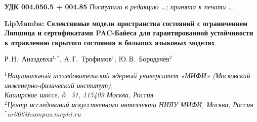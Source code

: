 \documentclass[12pt,a4paper]{article}
\theoremstyle{definition}
\theoremstyle{remark}
\begin{document}
\thispagestyle{empty}


\begin{otherlanguage}{russian}
\noindent\textbf{УДК 004.056.5 + 004.85}
\hfill
\textit{Поступила в редакцию \ldots; принята к печати \ldots}

\vspace{0.8em}

\begin{center}
{\large\bfseries
LipMamba: Селективные модели пространства состояний с
ограничением Липшица и сертификатами PAC-Байеса для
гарантированной устойчивости к отравлению скрытого состояния
в больших языковых моделях
\par}

\vspace{0.6em}

{\normalsize
Р.\,Н.~Анаэдевха$^{1,*}$, А.\,Г.~Трофимов$^{1}$, Ю.\,В.~Бородачёв$^{2}$
\par}

\vspace{0.4em}

{\small\itshape
$^{1}$Национальный исследовательский ядерный университет «МИФИ»
(Московский инженерно-физический институт),\\
Каширское шоссе, д.~31, 115409 Москва, Россия\\
$^{2}$Центр исследований искусственного интеллекта НИЯУ МИФИ,
Москва, Россия\\
$^{*}$ar006@campus.mephi.ru
\par}
\end{center}

\vspace{0.5em}


\end{otherlanguage}
\end{document}
